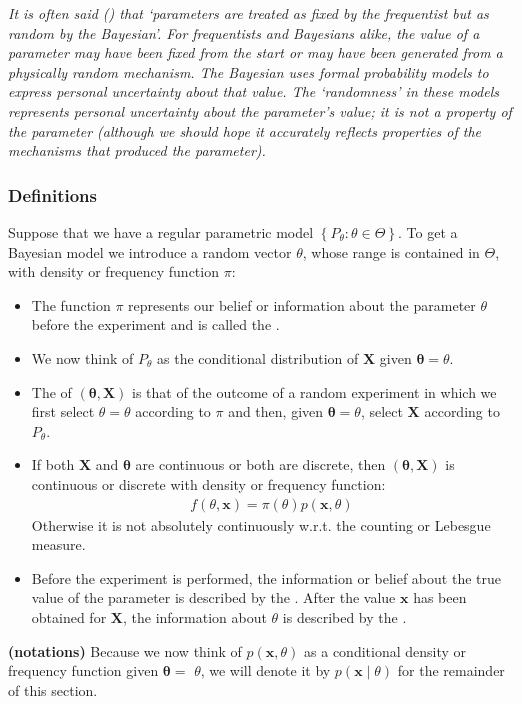 \documentclass{article}
\newcommand{\bfs}[1]{\textbf{({#1}) }}
\begin{document}
\emph{It is often said () that ‘parameters are treated as fixed by the frequentist but as random by the Bayesian’. For frequentists and Bayesians alike, the value of a parameter may have been fixed from the start or may have been generated from a physically random mechanism.  The Bayesian uses formal probability models to express personal uncertainty about that value. The ‘randomness’ in these models represents personal uncertainty about the parameter’s value; it is not a property of the parameter (although we should hope it accurately reflects properties of the mechanisms that produced the parameter).}
\subsubsection{Definitions}
 Suppose that we have a regular parametric model $\left\{P_{\theta}: \theta \in \Theta\right\}$. To get a Bayesian model we introduce a random vector $\theta$, whose range is contained in $\Theta$, with density or frequency function $\pi$:
 \begin{itemize}

     \item The function $\pi$ represents our belief or information about the parameter $\theta$ before the experiment and is called the .
     \item We now think of $P_{\theta}$ as the conditional distribution of $\mathbf{X}$ given $\boldsymbol{\theta}=\theta$. 
     \item The  of $(\boldsymbol{\theta}, \mathbf{X})$ is that of the outcome of a random experiment in which we first select $\theta=\theta$ according to $\pi$ and then, given $\boldsymbol{\theta}=\theta$, select $\mathbf{X}$ according to $P_{\theta}$. 
     \item If both $\mathbf{X}$ and $\boldsymbol{\theta}$ are continuous or both are discrete, then $(\boldsymbol{\theta}, \mathbf{X})$ is  continuous or discrete with density or frequency function: 
\begin{align*}
f(\theta, \mathbf{x})=\pi(\theta) p(\mathbf{x}, \theta)
\end{align*} Otherwise it is not absolutely  continuously w.r.t. the counting or Lebesgue measure.
\item Before the experiment is performed, the information or belief about the true value of the parameter is described by the . After the value $\mathbf{x}$ has been obtained for $\mathbf{X}$, the information about $\theta$ is described by the .
 \end{itemize}
 \begin{rema}\bfs{notations}
 Because we now think of $p(\mathbf{x}, \theta)$ as a conditional density or frequency function given $\boldsymbol{\theta}=$ $\theta$, we will denote it by $p(\mathbf{x} \mid \theta)$ for the remainder of this section.
 \end{rema}
\end{document}
